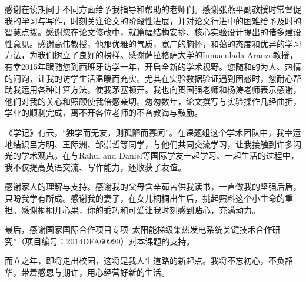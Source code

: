 \begin{ack}
感谢在读期间于不同方面给予我指导和帮助的老师们。感谢张燕平副教授时常督促我的学习与写作，时刻关注论文的阶段性进展，并对论文行进中的困难给予及时的智慧点拨。感谢您在论文修改中，就篇幅结构安排、核心实验设计提出的诸多建设性意见。感谢高伟教授，他那优雅的气质，宽广的胸怀，和蔼的态度和优异的学习方法，为我们树立了良好的榜样。感谢萨拉格萨大学的Inmaculada Arauzo教授，有幸2015年跟随您到西班牙访学一年，开启全新的学术视野。您随和的为人、热情的问询，让我的访学生活温暖而充实。尤其在实验数据验证遇到困惑时，您耐心帮助我运用各种计算方法，使我茅塞顿开。我也向贺国强老师和杨涛老师表示感谢，他们对我的关心和照顾使我倍感亲切。匆匆数年，论文撰写与实验操作几经曲折，学业的顺利完成，离不开各位老师的不吝教诲与鼓励。

《学记》有云，“独学而无友，则孤陋而寡闻”。在课题组这个学术团队中，我幸运地结识吕方明、王际洲、邹崇哲等同学，与他们共同交流学习，让我接触到许多闪光的学术观点。在与Rahul and Daniel等国际学友一起学习、一起生活的过程中，我不仅提高英语交流、写作能力，还收获了友谊。

感谢家人的理解与支持。感谢我的父母含辛茹苦供我读书，一直做我的坚强后盾，只盼我学有所成。感谢我的妻子，在女儿桐桐出生后，挑起照料这个小生命的重担。感谢桐桐开心果，你的乖巧和可爱让我时刻感到贴心，充满动力。

最后，感谢国家国际合作项目专项“太阳能梯级集热发电系统关键技术合作研究”（项目编号：2014DFA60990）对本课题的支持。

而立之年，即将走出校园，这将是我人生道路的新起点。我将不忘初心，不负韶华，带着感恩与期许，用心经营好新的生活。
%	


\end{ack}
